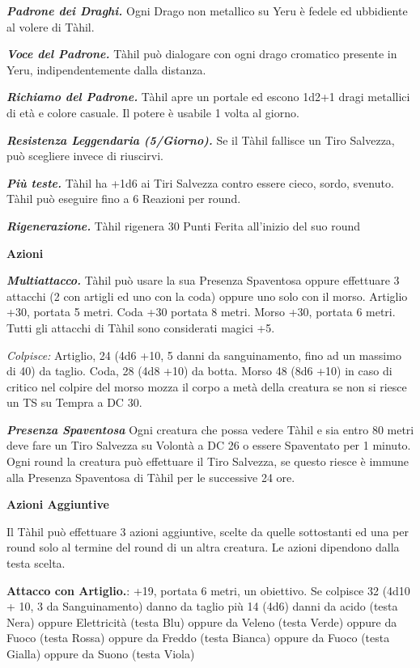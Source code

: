 \begin{multicols}{2}
\textit{\textbf{Padrone dei Draghi.}} Ogni Drago non metallico su Yeru è fedele ed ubbidiente al volere di Tàhil.

\textit{\textbf{Voce del Padrone.}} Tàhil può dialogare con ogni drago cromatico presente in Yeru, indipendentemente dalla distanza.

\textit{\textbf{Richiamo del Padrone.}} Tàhil apre un portale ed escono 1d2+1 dragi metallici di età e colore casuale. Il potere è usabile 1 volta al giorno.

\textit{\textbf{Resistenza Leggendaria (5/Giorno).}} Se il Tàhil fallisce un Tiro Salvezza, può scegliere invece di riuscirvi.

\textit{\textbf{Più teste.}} Tàhil ha +1d6 ai Tiri Salvezza contro essere cieco, sordo, svenuto. Tàhil può eseguire fino a 6 Reazioni per round.

\textit{\textbf{Rigenerazione.}} Tàhil rigenera 30 Punti Ferita all'inizio del suo round

\textbf{Azioni}

\textit{\textbf{Multiattacco.}} Tàhil può usare la sua Presenza Spaventosa oppure effettuare 3 attacchi (2 con artigli ed uno con la coda) oppure uno solo con il morso. Artiglio +30, portata 5 metri. Coda +30 portata 8 metri. Morso +30, portata 6 metri. Tutti gli attacchi di Tàhil sono considerati magici +5.

\textit{Colpisce:} Artiglio, 24 (4d6 +10, 5 danni da sanguinamento, fino ad un massimo di 40) da taglio. Coda, 28 (4d8 +10) da botta. Morso 48 (8d6 +10) in caso di critico nel colpire del morso mozza il corpo a metà della creatura se non si riesce un TS su Tempra a DC 30.

\textit{\textbf{Presenza Spaventosa}} Ogni creatura che possa vedere Tàhil e sia entro 80 metri deve fare un Tiro Salvezza su Volontà a DC 26 o essere Spaventato per 1 minuto. Ogni round la creatura può effettuare il Tiro Salvezza, se questo riesce è immune alla Presenza Spaventosa di Tàhil per le successive 24 ore.

\textbf{Azioni Aggiuntive}

Il Tàhil può effettuare 3 azioni aggiuntive, scelte da quelle sottostanti ed una per round solo al termine del round di un altra creatura. Le azioni dipendono dalla testa scelta.

\textbf{Attacco con Artiglio.}: +19, portata 6 metri, un obiettivo. Se colpisce 32 (4d10 + 10, 3 da Sanguinamento) danno da taglio più 14 (4d6) danni da acido (testa Nera) oppure Elettricità (testa Blu) oppure da Veleno (testa Verde) oppure da Fuoco (testa Rossa) oppure da Freddo (testa Bianca) oppure da Fuoco (testa Gialla) oppure da Suono (testa Viola)


\end{multicols}
